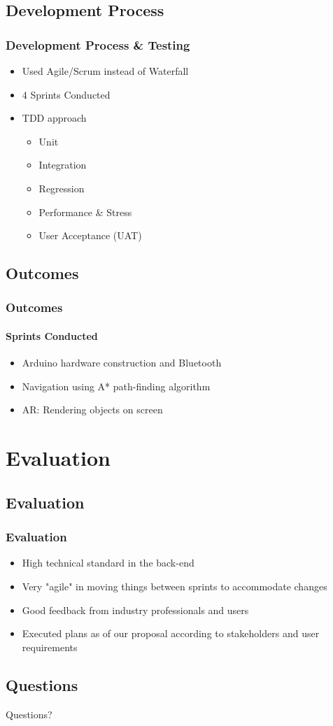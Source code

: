 \documentclass[compress]{beamer}
\begin{document}
	\subsection{Development Process}
	\begin{frame}
	    \frametitle{Development Process \& Testing}
		\begin{itemize}
			\item Used Agile/Scrum instead of Waterfall
			\item 4 Sprints Conducted
			\item TDD approach
			\begin{itemize}
				\item Unit
				\item Integration
				\item Regression
				\item Performance \& Stress
				\item User Acceptance (UAT)
			\end{itemize}
		\end{itemize}
	\end{frame}

	\subsection{Outcomes}
	\begin{frame}
		\frametitle{Outcomes}

		\framesubtitle{Sprints Conducted}
		\begin{itemize}
			\item Arduino hardware construction and Bluetooth
			\item Navigation using A* path-finding algorithm
			\item AR: Rendering objects on screen
		\end{itemize}
	\end{frame}

	\section{Evaluation}
	\subsection{Evaluation}
		\begin{frame}
			\frametitle{Evaluation}
			\begin{itemize}
				\item High technical standard in the back-end
				\item Very "agile" in moving things between sprints to accommodate changes
				\item Good feedback from industry professionals and users
				\item Executed plans as of our proposal according to stakeholders and user requirements
			\end{itemize}
		\end{frame}

	\subsection{Questions}
	\begin{frame}
		\begin{center}
			\Huge Questions?
		\end{center}
	\end{frame}
\end{document}
